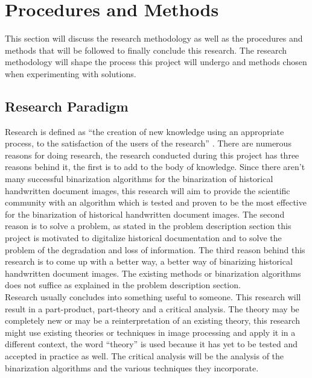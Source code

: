 \documentclass[11pt]{article}
\begin{document}
	\section{Procedures and Methods}%
		This section will discuss the research methodology as well as the procedures and methods that will be followed to finally conclude this research. The research methodology will shape the process this project will undergo and methods chosen when experimenting with solutions.

		\subsection{Research Paradigm}
			Research is defined as ``the creation of new knowledge using an appropriate process, to the satisfaction of the users of the research'' \cite{oates2005researching}. There are numerous reasons for doing research, the research conducted during this project has three reasons behind it, the first is to add to the body of knowledge. Since there aren't many successful binarization algorithms for the binarization of historical handwritten document images, this research will aim to provide the scientific community with an algorithm which is tested and proven to be the most effective for the binarization of historical handwritten document images. The second reason is to solve a problem, as stated in the problem description section this project is motivated to digitalize historical documentation and to solve the problem of the degradation and loss of information. The third reason behind this research is to come up with a better way, a better way of binarizing historical handwritten document images. The existing methods or binarization algorithms does not suffice as explained in the problem description section.\\

			Research usually concludes into something useful to someone. This research will result in a part-product, part-theory and a critical analysis. The theory may be completely new or may be a reinterpretation of an existing theory, this research might use existing theories or techniques in image processing and apply it in a different context, the word ``theory'' is used because it has yet to be tested and accepted in practice as well. The critical analysis will be the analysis of the binarization algorithms and the various techniques they incorporate.\\
\end{document}
